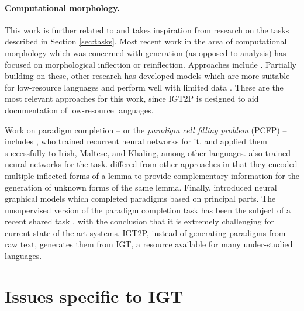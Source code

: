 \paragraph{Computational morphology.} 
This work is further related to and takes inspiration from research on the tasks described in Section \ref{sec:tasks}. Most recent work in the area of computational morphology which was concerned with generation (as opposed to analysis) has focused on morphological inflection or reinflection. Approaches include \citet{durrett-denero-2013-supervised,nicolai-etal-2015-inflection,faruqui-etal-2016-morphological,kann-schutze-2016-single,aharoni-goldberg-2017-morphological}. Partially building on these, other research has developed models which are more suitable for low-resource languages and perform well with limited data \citep{kann-etal-2017-one,sharma-etal-2018-iit,makarov-clematide-2018-imitation,wu-cotterell-2019-exact,kann2020learning,wu2020applying}. These are the most relevant approaches for this work, since IGT2P is designed to aid documentation of low-resource languages. 

Work on paradigm completion -- or the \textit{paradigm cell filling problem} (PCFP) \citep{ackerman2009} -- includes
\citet{malouf_generating_2016}, who trained recurrent neural networks for it, and applied them successfully to Irish, Maltese, and Khaling, among other languages. \citet{silfverberg_encoder-decoder_2018} also trained neural networks for the task.  \citet{kann-etal-2017-neural} differed from other approaches in that they encoded multiple inflected forms of a lemma to provide complementary information for the generation of unknown forms of the same lemma.
Finally, \citet{cotterell-etal-2017-neural} introduced neural graphical models which completed paradigms based on principal parts.
The unsupervised version of the paradigm completion task \citep{jin2020unsupervised} has been the subject of a recent shared task \citep{kann2020sigmorphon}, with the conclusion that it is extremely challenging for current state-of-the-art systems. IGT2P, instead of generating paradigms from raw text, generates them from IGT, a resource available for many under-studied languages.


\section{Issues specific to IGT}
\label{sec:issues}

